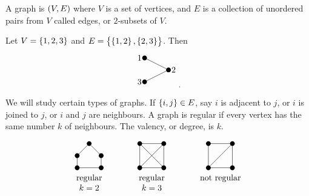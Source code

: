 A graph is $ \br{V, E} $ where $ V $ is a set of vertices, and $ E $ is a collection of unordered pairs from $ V $ called edges, or $ 2 $-subsets of $ V $.

\begin{example*}
Let $ V = \cbr{1, 2, 3} $ and $ E = \cbr{\cbr{1, 2}, \cbr{2, 3}} $. Then
$$
\begin{tikzpicture}
\fill (0, 0) circle (0.1) node[left]{$ 1 $};
\fill (1, -0.5) circle (0.1) node[right]{$ 2 $};
\fill (0, -1) circle (0.1) node[left]{$ 3 $};
\draw (0, 0) to (1, -0.5);
\draw (1, -0.5) to (0, -1);
\end{tikzpicture}.
$$
\end{example*}

We will study certain types of graphs. If $ \cbr{i, j} \in E $, say $ i $ is adjacent to $ j $, or $ i $ is joined to $ j $, or $ i $ and $ j $ are neighbours. A graph is regular if every vertex has the same number $ k $ of neighbours. The valency, or degree, is $ k $.

\begin{example*}
$$
\begin{array}{ccccc}
\begin{tikzpicture}
\fill (0, 0) circle (0.1);
\fill (-0.5, -0.5) circle (0.1);
\fill (0.5, -0.5) circle (0.1);
\fill (-0.5, -1) circle (0.1);
\fill (0.5, -1) circle (0.1);
\draw (0, 0) to (-0.5, -0.5);
\draw (0, 0) to (0.5, -0.5);
\draw (-0.5, -0.5) to (-0.5, -1);
\draw (0.5, -0.5) to (0.5, -1);
\draw (-0.5, -1) to (0.5, -1);
\end{tikzpicture}
& \qquad &
\begin{tikzpicture}
\fill (0, 0) circle (0.1);
\fill (1, 0) circle (0.1);
\fill (0, -1) circle (0.1);
\fill (1, -1) circle (0.1);
\draw (0, 0) to (1, 0);
\draw (0, 0) to (0, -1);
\draw (0, 0) to (1, -1);
\draw (1, 0) to (0, -1);
\draw (1, 0) to (1, -1);
\draw (0, -1) to (1, -1);
\end{tikzpicture}
& \qquad &
\begin{tikzpicture}
\fill (0, 0) circle (0.1);
\fill (1, 0) circle (0.1);
\fill (0, -1) circle (0.1);
\fill (1, -1) circle (0.1);
\draw (0, 0) to (1, 0);
\draw (0, 0) to (0, -1);
\draw (1, 0) to (0, -1);
\draw (1, 0) to (1, -1);
\draw (0, -1) to (1, -1);
\end{tikzpicture}
\\
\text{regular} & & \text{regular} & & \text{not regular} \\
k = 2 & & k = 3 & &
\end{array}
$$
\end{example*}

